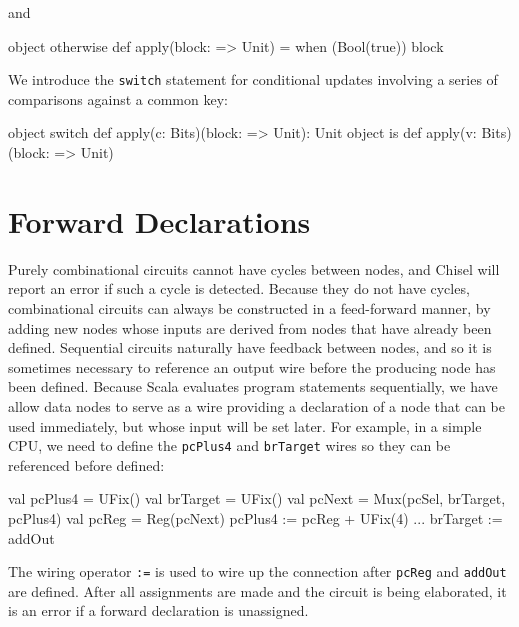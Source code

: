 \documentclass[10pt,twocolumn]{article}
\def\code#1{{\small\tt #1}}
\begin{document}
\begin{scala}
object unless {
  def apply(c: Bool)(block: => Unit) = 
    when (!c) { block )
}
\end{scala}

\noindent 
and

\begin{scala}
object otherwise {
  def apply(block: => Unit) = 
    when (Bool(true)) { block }
}
\end{scala}

We introduce the \code{switch} statement for conditional updates
involving a series of comparisons against a common key:

\begin{scala}
object switch {
  def apply(c: Bits)(block: => Unit): Unit
}
object is {
  def apply(v: Bits)(block: => Unit)
}
\end{scala}

\section{Forward Declarations}

Purely combinational circuits cannot have cycles between nodes, and
Chisel will report an error if such a cycle is detected.  Because they
do not have cycles, combinational circuits can always be constructed
in a feed-forward manner, by adding new nodes whose inputs are derived
from nodes that have already been defined.  Sequential circuits
naturally have feedback between nodes, and so it is sometimes
necessary to reference an output wire before the producing node has
been defined.  Because Scala evaluates program statements
sequentially, we have allow data nodes to serve as a wire providing
a declaration of a node that can be used immediately, but whose
input will be set later.  
For example, in a simple CPU, we need to define the \verb!pcPlus4!
and \verb!brTarget! wires so they can be referenced before defined:
\begin{scala}
val pcPlus4  = UFix()
val brTarget = UFix()
val pcNext   = Mux(pcSel, brTarget, pcPlus4)
val pcReg    = Reg(pcNext)
pcPlus4     := pcReg + UFix(4)
...
brTarget    := addOut
\end{scala}

\noindent
The wiring operator
\verb!:=! is used to wire up
the connection after \verb!pcReg! and \verb!addOut! are defined.
After all assignments are made and the circuit is being elaborated, 
it is an error if a forward declaration is unassigned.
\end{document}
